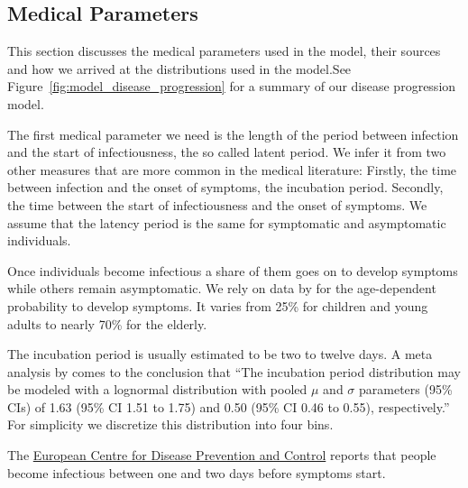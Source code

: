 \subsection{Medical Parameters}
\label{sec:medical_params}

This section discusses the medical parameters used in the model, their sources and how we
arrived at the distributions used in the model.\footnotemark See
Figure~\ref{fig:model_disease_progression} for a summary of our disease progression model.



The first medical parameter we need is the length of the period between infection and the
start of infectiousness, the so called latent period. We infer it from two other measures
that are more common in the medical literature: Firstly, the time between infection and
the onset of symptoms, the incubation period. Secondly, the time between the start of
infectiousness and the onset of symptoms. We assume that the latency period is the same
for symptomatic and asymptomatic individuals.

Once individuals become infectious a share of them goes on to develop symptoms while
others remain asymptomatic. We rely on data by \cite{Davies2020} for the age-dependent
probability to develop symptoms. It varies from 25\% for children and young adults to
nearly 70\% for the elderly.

The incubation period is usually estimated to be two to twelve days. A meta analysis by
\citet{McAloon2020} comes to the conclusion that ``The incubation period distribution may
be modeled with a lognormal distribution with pooled $\mu$ and $\sigma$ parameters (95\%
CIs) of 1.63 (95\% CI 1.51 to 1.75) and 0.50 (95\% CI 0.46 to 0.55), respectively.'' For
simplicity we discretize this distribution into four bins.

The \href{https://bit.ly/3pi18Ax}{European Centre for Disease Prevention and Control}
reports that people become infectious between one and two days before symptoms
start.\footnotemark


